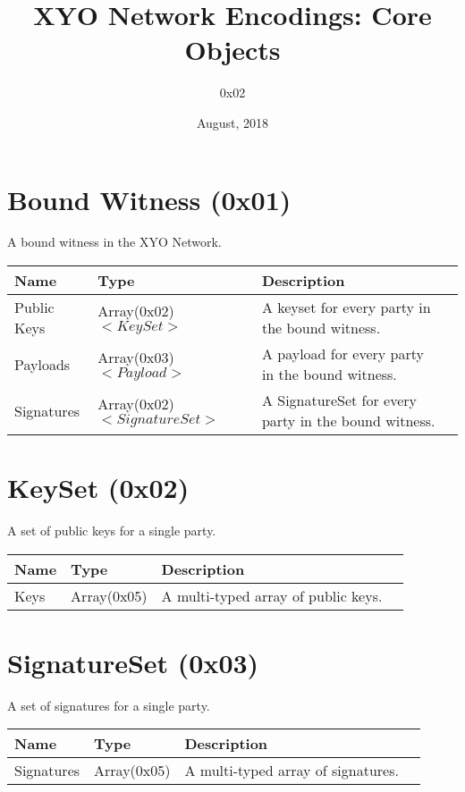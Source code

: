 \documentclass[11pt]{article}
\title{XYO Network Encodings: Core Objects}
\author{0x02}
\date{August, 2018}
\begin{document}
\maketitle

\section{Bound Witness (0x01)}
A bound witness in the XYO Network.

\begin{center}
\begin{tabular}{ |l|l|l|l| } 
\hline
\textbf{Name} & \textbf{Type} & \textbf{Description}\\
\hline
Public Keys & Array(0x02)$<KeySet>$ & A keyset for every party in the bound witness. \\  
Payloads & Array(0x03)$<Payload>$  & A payload for every party in the bound witness.\\  
Signatures & Array(0x02)$<SignatureSet>$ & A SignatureSet for every party in the bound witness.\\  
 
\hline
\end{tabular}
\end{center}

\section{KeySet (0x02)}
A set of public keys for a single party.
\begin{center}
\begin{tabular}{ |l|l|l|l| } 
\hline
\textbf{Name} & \textbf{Type} & \textbf{Description}\\
\hline
Keys & Array(0x05) & A multi-typed array of public keys.\\  
 
\hline
\end{tabular}
\end{center}

\section{SignatureSet (0x03)}
A set of signatures for a single party.
\begin{center}
\begin{tabular}{ |l|l|l|l| } 
\hline
\textbf{Name} & \textbf{Type} & \textbf{Description}\\
\hline
Signatures & Array(0x05) & A multi-typed array of signatures.\\  
 
\hline
\end{tabular}
\end{center}
\end{document}

